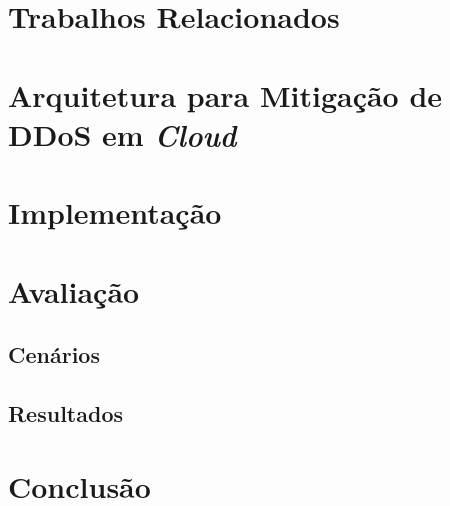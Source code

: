 \documentclass[a4paper, 12pt]{article}
\begin{document}
\section{Trabalhos Relacionados}


\section{Arquitetura para Mitigação de DDoS em \emph{Cloud}}



\section{Implementação}


\section{Avaliação}


\subsection{Cenários}


\subsection{Resultados}


\section{Conclusão}



%

%


% 



\end{document}
